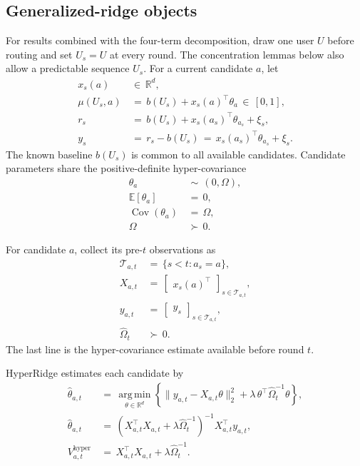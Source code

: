 \documentclass{article} %
\begin{document}
\subsection{Generalized-ridge objects}

For results combined with the four-term decomposition, draw one user \(U\)
before routing and set \(U_s=U\) at every round. The concentration lemmas below
also allow a predictable sequence \(U_s\). For a current candidate \(a\), let
\begin{align}
x_s(a)
&\,\in\,
\mathbb R^d,
\label{eq:hyper-feature}
\\
\mu(U_s,a)
&\,=\,
b(U_s)+x_s(a)^\top\theta_a
\,\in\,
[0,1],
\label{eq:hyper-linear-model-app}
\\
r_s
&\,=\,
b(U_s)+x_s(a_s)^\top\theta_{a_s}+\xi_s,
\label{eq:hyper-reward}
\\
y_s
&\,=\,
r_s-b(U_s)
\,=\,
x_s(a_s)^\top\theta_{a_s}+\xi_s.
\label{eq:hyper-centered-reward}
\end{align}
The known baseline \(b(U_s)\) is common to all available candidates.
Candidate parameters share the positive-definite hyper-covariance
\begin{align}
\theta_a
&\,\sim\,
(0,\Omega),
\label{eq:hyper-random-effects}
\\
\mathbb E[\theta_a]
&\,=\,
0,
\label{eq:hyper-random-effects-mean}
\\
\operatorname{Cov}(\theta_a)
&\,=\,
\Omega,
\label{eq:hyper-random-effects-cov}
\\
\Omega
&\,\succ\,
0.
\label{eq:hyper-omega-pd}
\end{align}

For candidate \(a\), collect its pre-\(t\) observations as
\begin{align}
\mathcal T_{a,t}
&\,=\,
\{s<t:a_s=a\},
\label{eq:hyper-index-set}
\\
X_{a,t}
&\,=\,
\begin{bmatrix}
x_s(a)^\top
\end{bmatrix}_{s\in\mathcal T_{a,t}},
\label{eq:hyper-design-app}
\\
y_{a,t}
&\,=\,
\begin{bmatrix}
y_s
\end{bmatrix}_{s\in\mathcal T_{a,t}},
\label{eq:hyper-response}
\\
\widehat\Omega_t
&\,\succ\,
0.
\label{eq:hyper-omega-hat}
\end{align}
The last line is the hyper-covariance estimate available before round \(t\).

HyperRidge estimates each candidate by
\begin{align}
\widehat{\theta}_{a,t}
&\,=\,
\operatorname*{arg\,min}_{\theta\in\mathbb{R}^d}
\left\{
\|y_{a,t}-X_{a,t}\theta\|_2^2
+
\lambda\,\theta^\top\widehat{\Omega}_t^{-1}\theta
\right\},
\label{eq:hyper-estimator-argmin}
\\
\widehat{\theta}_{a,t}
&\,=\,
\left(
X_{a,t}^\top X_{a,t}
+
\lambda \widehat{\Omega}_t^{-1}
\right)^{-1}
X_{a,t}^\top y_{a,t},
\label{eq:hyper-estimator-closed}
\\
V_{a,t}^{\mathrm{hyper}}
&\,=\,
X_{a,t}^\top X_{a,t}
+
\lambda\widehat{\Omega}_t^{-1}.
\label{eq:hyper-vhat}
\end{align}
\end{document}
